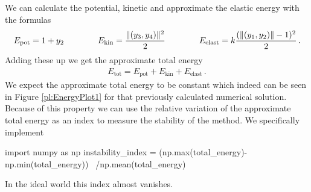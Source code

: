 \documentclass{report}
\DeclarePairedDelimiter{\norm}{\lVert}{\rVert}
\newcounter{constant}
\begin{document}
We can calculate the potential, kinetic and approximate the elastic energy with the formulas
\begin{align*}
	E_{\text{pot}}=1+y_2
	\qquad\qquad E_{\text{kin}}=\frac{\norm{(y_3,y_4)}^2}{2}
	\qquad\qquad E_{\text{elast}}=k\frac{(\norm{(y_1,y_2)}-1)^2}{2}\,.
\end{align*}
Adding these up we get the approximate total energy
\begin{align*}
	E_{\text{tot}}=E_{\text{pot}}+E_{\text{kin}}+E_{\text{elast}}\,.
\end{align*}
We expect the approximate total energy to be constant which indeed can be seen in Figure \ref{pl:EnergyPlot1} for that previously calculated numerical solution.
Because of this property we can use the relative variation of the approximate total energy as an index to measure the stability of the method. We specifically implement
\begin{python}
import numpy as np
instability_index = (np.max(total_energy)-np.min(total_energy)) \
				              /np.mean(total_energy)
\end{python}
In the ideal world this index almost vanishes.
\end{document}
